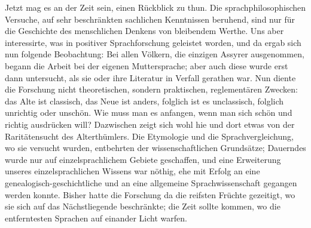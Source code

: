 \label{I.IV.rueckblick}
Jetzt mag es an der Zeit sein, einen Rückblick zu thun. Die sprachphilosophischen Versuche, auf sehr beschränkten sachlichen Kenntnissen beruhend, sind nur für die Geschichte des menschlichen Denkens von bleibendem Werthe. Uns aber interessirte, was in positiver Sprachforschung geleistet worden, und da ergab sich nun folgende Beobachtung: Bei allen Völkern, die einzigen Assyrer ausgenommen, begann die Arbeit bei der eigenen Muttersprache; aber auch diese wurde erst dann untersucht, als sie oder ihre Literatur in Verfall gerathen war. Nun diente die Forschung nicht theoretischen, sondern praktischen, \label{sp.25} reglementären Zwecken: das Alte ist classisch, das Neue ist anders, folglich ist es unclassisch, folglich unrichtig oder unschön. Wie muss man es anfangen, wenn man sich schön und richtig ausdrücken will? Dazwischen zeigt sich wohl hie und dort etwas von der Raritätensucht des Alterthümlers. Die Etymologie und die Sprachvergleichung, wo sie versucht wurden, entbehrten der wissenschaftlichen Grundsätze; Dauerndes wurde nur auf einzelsprachlichem Gebiete geschaffen, und eine Erweiterung unseres einzelsprachlichen Wissens war nöthig, ehe mit Erfolg an eine genealogisch-geschichtliche und an eine allgemeine Sprachwissenschaft gegangen werden konnte. Bisher hatte die Forschung da die reifsten Früchte gezeitigt, wo sie sich auf das Nächstliegende beschränkte; die Zeit sollte kommen, wo die entferntesten Sprachen auf einander Licht warfen.

